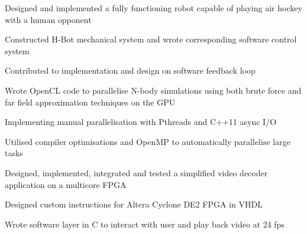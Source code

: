 \documentclass[letterpaper]{deedy-resume} %
\begin{document}
\begin{minipage}[t]{0.66\textwidth}
\begin{tightitemize}
\item Designed and implemented a fully functioning robot capable of playing air hockey with a human opponent
\item Constructed H-Bot mechanical system and  wrote corresponding software control system
\item Contributed to implementation and design on software feedback loop
\end{tightitemize}


\begin{tightitemize}
\item Wrote OpenCL code to parallelise N-body simulations using both brute force and far field approximation techniques on the GPU
\item Implementing manual parallelisation with Pthreads and C++11 async I/O
\item Utilised compiler optimisations and OpenMP to automatically parallelise large tasks
\end{tightitemize}


\begin{tightitemize}
\item Designed, implemented, integrated and tested a simplified video decoder application on a multicore FPGA
\item Designed custom instructions for Altera Cyclone DE2 FPGA in VHDL
\item Wrote software layer in C to interact with user and play back video at 24 fps
\end{tightitemize}

\end{minipage} %



\end{document}
